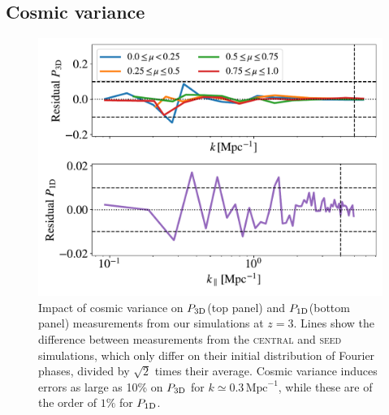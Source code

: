\documentclass{aa}
\newcommand{\poned}{\ensuremath{P_{\rm 1D}}\xspace}
\newcommand{\pthreed}{\ensuremath{P_{\rm 3D}}\xspace}
\newcommand{\simseed}{\textsc{seed}\xspace}
\newcommand{\simcentral}{\textsc{central}\xspace}
\newcommand{\iMpc}{\ensuremath{\,\mathrm{Mpc}^{-1}}}
\begin{document}




\begin{appendix}


\section{Cosmic variance}
\label{sec:cosmic_variance}

\begin{figure}
    \centering\includegraphics[width=\columnwidth]{figures/cvariance_z_3.0.pdf}
    \caption{Impact of cosmic variance on \pthreed (top panel) and \poned (bottom panel) measurements from our simulations at $z=3$. Lines show the difference between measurements from the \simcentral and \simseed simulations, which only differ on their initial distribution of Fourier phases, divided by $\sqrt{2}$ times their average. Cosmic variance induces errors as large as 10\% on \pthreed for $k\simeq0.3\iMpc$, while these are of the order of $1\%$ for \poned.}
    \label{fig:cvar}
\end{figure}



\end{appendix}
\end{document}

